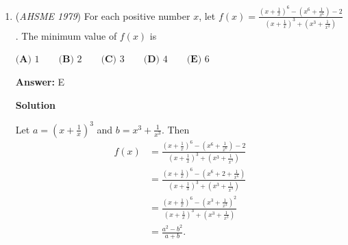 \begin{enumerate}
 \textbf{Answer: }D



\textbf{Solution 1 (Coordinate Geometry)}

The circles can be described in the cartesian plane as being centered at $(-1,0),(1,0)$ and $(0,\sqrt{3})$ with radius $r$ by the equations 

 $x^2+(y-\sqrt{3})^2=r^2$
$(x+1)^2+y^2=r^2$
$(x-1)^2+y^2=r^2$.

 Solving the first 2 equations gives $x=1-\sqrt{3}\cdot y$ which when substituted back in gives $y=\frac{\sqrt{3}\pm \sqrt{r^2-1}}{2}$.

 The larger root $y=\frac{\sqrt{3}+\sqrt{r^2-1}}{2}$ is the point B' described in the question. This root corresponds to $x=-\frac{1+\sqrt{3(r^2-1)}}{2}$. 

 By symmetry across the y-axis the length of the line segment $B'C'$ is $1+\sqrt{3(r^2-1)}$ which is $\boxed{D}$.

 



\textbf{Solution 2 (Synthetic)}

Suppose $B’B$ and $AC$ intersect at $P$. By the Pythagorean Theorem, $B’P = \sqrt{r^2 - 1}$ and by a $30-60-90$ triangle, $PB = \sqrt{3}$. Using Ptolemy’s Theorem on isosceles trapezoid $BCB’C’$, we get that 
 \[2(B’C’) + r^2 = (\sqrt{3} + \sqrt{r^2 - 1})^2.\] After a little algebra, we get that $B’C’ = \boxed{1 + \sqrt{3(r^2 - 1)}}$ as desired.\href{https://artofproblemsolving.com/wiki/index.php?title=User:Solasky}{Solasky} (\href{https://artofproblemsolving.com/wiki/index.php?title=User\_talk:Solasky&action=edit&redlink=1}{talk}) 12:29, 27 May 2023 (EDT)

 


	\item (\textit{AHSME 1979}) For each positive number $x$, let 
$f(x)=\frac{\left(x+\frac{1}{x}\right)^6-\left(x^6+\frac{1}{x^6}\right)-2} {\left(x+\frac{1}{x}\right)^3+\left(x^3+\frac{1}{x^3}\right)}$. 
The minimum value of $f(x)$ is


 $\textbf{(A) }1\qquad \textbf{(B) }2\qquad \textbf{(C) }3\qquad \textbf{(D) }4\qquad \textbf{(E) }6$

 \textbf{Answer: }E



\textbf{Solution}

Let $a = \left( x + \frac{1}{x} \right)^3$ and $b = x^3 + \frac{1}{x^3}$. Then
 \begin{align*} f(x) &= \frac{\left( x + \frac{1}{x} \right)^6 - (x^6 + \frac{1}{x^6}) - 2}{\left( x + \frac{1}{x} \right)^3 + (x^3 + \frac{1}{x^3})} \\ &= \frac{\left( x + \frac{1}{x} \right)^6 - (x^6 + 2 + \frac{1}{x^6})}{\left( x + \frac{1}{x} \right)^3 + (x^3 + \frac{1}{x^3})} \\ &= \frac{\left( x + \frac{1}{x} \right)^6 - (x^3 + \frac{1}{x^3})^2}{\left( x + \frac{1}{x} \right)^3 + (x^3 + \frac{1}{x^3})} \\ &= \frac{a^2 - b^2}{a + b}. \end{align*}



\end{enumerate}
